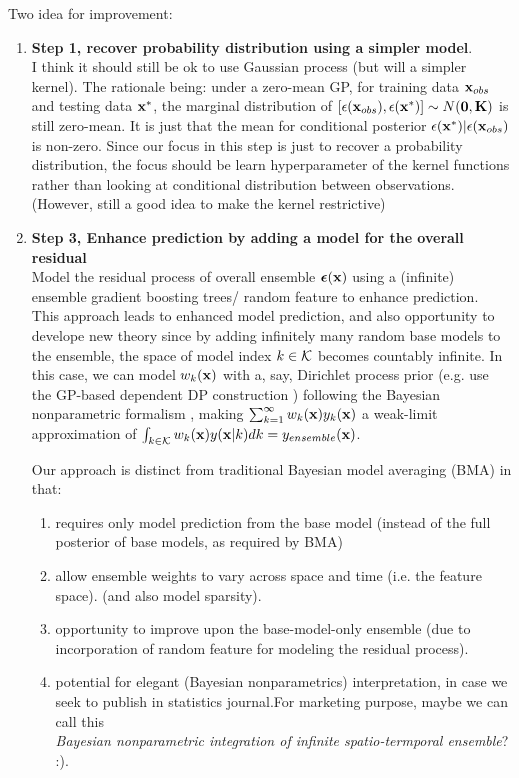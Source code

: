 \documentclass[11pt]{article}
\theoremstyle{definition}
\begin{document}
Two idea for improvement: 
\begin{enumerate}
\item \textbf{Step 1, recover probability distribution using a simpler model}. \\ 
I think it should still be ok to use Gaussian process (but will a simpler kernel). The rationale being: under a zero-mean GP, for  training data ${\bf x}_{obs}$ and testing data ${\bf x}^*$, the marginal distribution of $[\epsilon({\bf x}_{obs}), \epsilon({\bf x}^*)] \sim N({\bf 0}, {\bf K})$ is still zero-mean. It is just that the mean for conditional posterior $\epsilon({\bf x}^*)|\epsilon({\bf x}_{obs})$ is non-zero. Since our focus in this step is just to recover a probability distribution, the focus should be learn hyperparameter of the kernel functions rather than looking at conditional distribution between observations. (However, still a good idea to make the kernel restrictive)
\item \textbf{Step 3, Enhance prediction by adding a model for the overall residual}\\
Model the residual process of overall ensemble $\boldsymbol{\epsilon}({\bf x})$ using a (infinite) ensemble gradient boosting trees/ random feature \citep{rahimi_weighted_2009} to enhance prediction. \\
This approach leads to enhanced model prediction, and also  opportunity to develope new theory since by adding infinitely many random base models to the ensemble, the space of model index $k \in {\cal K}$ becomes countably infinite. In this case, we can model $w_k({\bf x})$ with a, say, Dirichlet process prior (e.g. use the GP-based dependent DP construction \citep{jara_class_2011}) following the Bayesian nonparametric formalism , making $\sum_{k=1}^\infty w_k({\bf x})y_k({\bf x})$ a weak-limit approximation of $\int_{k \in {\cal K}} w_k({\bf x})y({\bf x}|k) dk = y_{ensemble}({\bf x})$. 

Our approach is distinct from traditional Bayesian model averaging (BMA) in that:
\begin{enumerate}
\item requires only model prediction from the base model (instead of the full posterior of base models, as required by BMA)
\item allow ensemble weights to vary across space and time (i.e. the feature space). (and also model sparsity).
\item opportunity to improve upon the base-model-only ensemble (due to incorporation of random feature for modeling the residual process).
\item potential for elegant (Bayesian nonparametrics) interpretation, in case we seek to  publish in statistics journal.For marketing purpose, maybe we can call this\\ \textit{Bayesian nonparametric integration of infinite spatio-termporal ensemble}? :).
\end{enumerate}


\end{enumerate}
\end{document}
